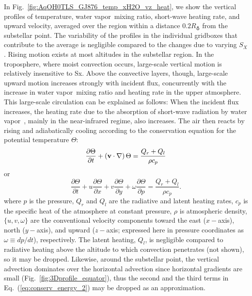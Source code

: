 \documentclass[11pt,numberedappendix,twocolappendix,]{emulateapj}
\newcommand{\yf}[1]{{\color{orange}#1}}
\newcommand{\wv}{water vapor\ }
\begin{document}
In Fig.~\ref{fig:AqOH0TLS_GJ876_temp_xH2O_vz_heat}, we show the vertical profiles of temperature, \wv mixing ratio, short-wave heating rate, and upward velocity, averaged over the region within a distance $0.2R_\earth$ from the substellar point. 
The \yf{variability of the profiles in the individual gridboxes that contribute to the average}
is negligible compared to the changes due to varying $S_X$. 
%
\yf{Rising motion exists at most altitudes in the substellar region.  In the troposphere, where moist convection occurs, large-scale vertical motion is relatively insensitive to Sx.  Above the convective layers, though, large-scale upward motion increases strongly with incident flux,}
%
concurrently with the increase in \wv mixing ratio and heating rate in the upper atmosphere. 
This large-scale circulation can be explained as follows: When the incident flux increases, the heating rate due to the absorption of short-wave radiation by \wv, mainly \yf{in the near-infrared regime}, also increases. 
The air then reacts by rising and adiabatically cooling according to the conservation equation for the potential temperature $\Theta $:
\begin{equation}
\frac{\partial \Theta }{\partial t} + ( {\bf v} \cdot \nabla ) \, \Theta = \frac{ Q_r + Q_l }{\rho c_p} \label{eq:conserv_energy}
\end{equation}
or
\begin{equation}
\frac{\partial \Theta }{\partial t} + u \frac{\partial \Theta }{\partial x} + v\frac{\partial \Theta }{\partial y} + \omega \frac{\partial \Theta }{\partial p} = \frac{ Q_r + Q_l }{\rho c_p}. \label{eq:conserv_energy_2}
\end{equation}
where $p$ is the pressure, $Q_r$ and $Q_l$ are the radiative and latent heating rates, $c_p$ is the specific heat of the atmosphere at constant pressure, $\rho $ is atmospheric density, $\{ u, v, \omega \}$ are the conventional velocity components toward the east ($x-$axis), north ($y-$axis), and upward ($z-$axis; expressed here in pressure coordinates as $\omega \equiv dp/dt$), respectively. 
The latent heating, $Q_l$, is negligible compared to radiative heating above the altitude to which convection penetrates (not shown), so it may be dropped. 
Likewise, around the substellar point, the vertical advection dominates over the horizontal advection since horizontal gradients are small (Fig.~\ref{fig:3Dprofile_equator}), thus the second and the third terms in Eq.~(\ref{eq:conserv_energy_2}) may be dropped as an approximation. 
\end{document}
